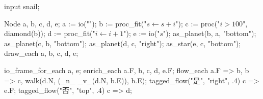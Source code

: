 \usemodule[zhfonts]
\startMPpage
input snail;

Node a, b, c, d, e;
a := io("");
b := proc_fit("$s\leftarrow s + i$");
c := proc("$i > 100$", diamond(b));
d := proc_fit("$i\leftarrow i + 1$");
e := io("$s$");
as_planet(b, a, "bottom");
as_planet(c, b, "bottom");
as_planet(d, c, "right");
as_star(e, c, "bottom");
draw_each a, b, c, d, e;

io_frame_for_each a, e;
enrich_each a.F, b, c, d, e.F;
flow_each a.F => b, b => c, walk(d.N, (_n_ _v_(d.N, b.E)), b.E);
tagged_flow("是", "right", .4) c => e.F;
tagged_flow("否", "top", .4) c => d;
\stopMPpage
